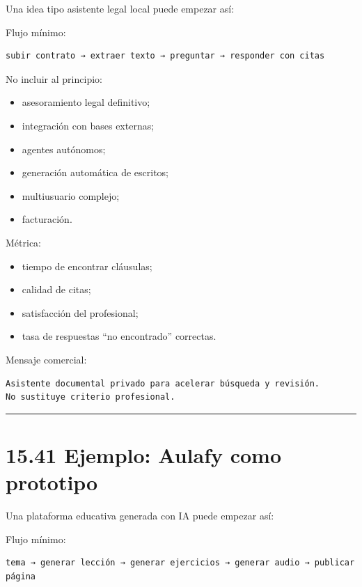 Una idea tipo asistente legal local puede empezar así:

Flujo mínimo:

\begin{lstlisting}
subir contrato → extraer texto → preguntar → responder con citas
\end{lstlisting}

No incluir al principio:

\begin{itemize}
\tightlist
\item
  asesoramiento legal definitivo;
\item
  integración con bases externas;
\item
  agentes autónomos;
\item
  generación automática de escritos;
\item
  multiusuario complejo;
\item
  facturación.
\end{itemize}

Métrica:

\begin{itemize}
\tightlist
\item
  tiempo de encontrar cláusulas;
\item
  calidad de citas;
\item
  satisfacción del profesional;
\item
  tasa de respuestas ``no encontrado'' correctas.
\end{itemize}

Mensaje comercial:

\begin{lstlisting}
Asistente documental privado para acelerar búsqueda y revisión.
No sustituye criterio profesional.
\end{lstlisting}

\begin{center}\rule{0.5\linewidth}{0.5pt}\end{center}

\section{15.41 Ejemplo: Aulafy como
prototipo}\label{ejemplo-aulafy-como-prototipo}

Una plataforma educativa generada con IA puede empezar así:

Flujo mínimo:

\begin{lstlisting}
tema → generar lección → generar ejercicios → generar audio → publicar página
\end{lstlisting}

